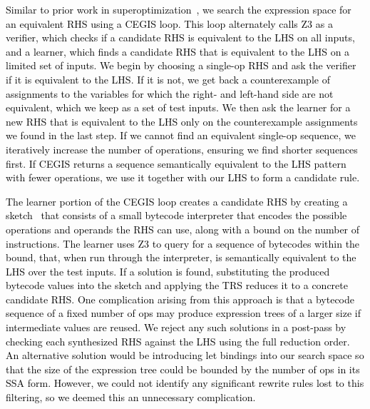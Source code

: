 \documentclass[acmsmall]{acmart}\settopmatter{}
\newcommand{\modified}[1]{\textcolor{black}{{#1}}}
\begin{document}
\modified{Similar to prior work in superoptimization~\cite{regehr2018superoptimization, mangpo2016superoptimization},
we search the expression space for an equivalent RHS using a CEGIS loop. This loop alternately calls Z3 as a
verifier, which checks if a candidate RHS is equivalent to the LHS on all inputs, 
and a learner, which finds a candidate RHS that is equivalent to the LHS on
a limited set of inputs.
We begin by choosing a single-op
RHS and ask the verifier if it is equivalent to the LHS. If it is not, we get back 
a counterexample of assignments to the variables for which the right- and left-hand side are 
not equivalent, which we keep as a set of test inputs. 
We then ask the learner for a new RHS that is equivalent to the LHS 
only on the counterexample assignments we found in the last step. 
If we cannot find an equivalent single-op sequence,
we iteratively increase the number of operations, ensuring we find shorter sequences
first.  If CEGIS returns a sequence semantically equivalent to the LHS pattern with fewer
operations, we use it together with our LHS to form a candidate rule.}

\modified{ The learner portion of the CEGIS loop creates a candidate RHS
  by creating a sketch~\cite{DBLP:conf/aplas/Solar-Lezama09, torlak2014lightweight}
  that consists of a small bytecode interpreter that encodes the possible
  operations and operands the RHS can use, along with a bound on the number of instructions.
  The learner uses Z3 to query for a sequence of bytecodes within the bound, that, when
  run through the interpreter, is semantically
  equivalent to the LHS over the test inputs. If a solution is found,
  substituting the produced bytecode values into the sketch
  and applying the TRS reduces it to a concrete candidate RHS. One
  complication arising from this approach is that a bytecode sequence
  of a fixed number of ops may produce expression trees of a larger
  size if intermediate values are reused. We reject any such solutions
  in a post-pass by checking each synthesized RHS against the LHS
  using the full reduction order. An alternative solution would be
  introducing let bindings into our search space so that the size of
  the expression tree could be bounded by the number of ops in its SSA
  form. However, we could not identify any significant rewrite rules
  lost to this filtering, so we deemed this an unnecessary
  complication. }
\end{document}
